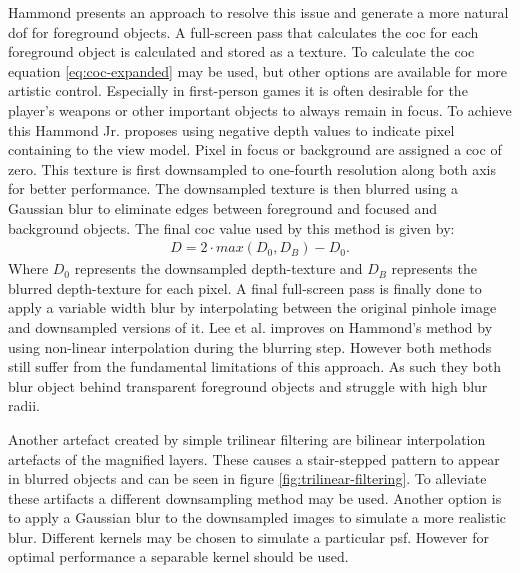Hammond \cite{Hammon.2008} presents an approach to resolve this issue and generate a more natural \gls{dof} for foreground objects.
A full-screen pass that calculates the \gls{coc} for each foreground object is calculated and stored as a texture.
To calculate the \gls{coc} equation \ref{eq:coc-expanded} may be used, but other options are available for more artistic control.
Especially in first-person games it is often desirable for the player's weapons or other important objects to always remain in focus.
To achieve this Hammond Jr. proposes using negative depth values to indicate pixel containing to the view model.
Pixel in focus or background are assigned a \gls{coc} of zero.
This texture is first downsampled to one-fourth resolution along both axis for better performance.
The downsampled texture is then blurred using a Gaussian blur to eliminate edges between foreground and focused and background objects.
The final \gls{coc} value used by this method is given by:
\begin{align}
    D = 2 \cdot max(D_0, D_B) - D_0.
\end{align}
Where $D_0$ represents the downsampled depth-texture and $D_B$ represents the blurred depth-texture for each pixel.
A final full-screen pass is finally done to apply a variable width blur by interpolating between the original pinhole image and downsampled versions of it.
Lee et al. \cite{Lee.2009} improves on Hammond's method by using non-linear interpolation during the blurring step.
However both methods still suffer from the fundamental limitations of this approach.
As such they both blur object behind transparent foreground objects and struggle with high blur radii.

Another artefact created by simple trilinear filtering are bilinear interpolation artefacts of the magnified layers.
These causes a stair-stepped pattern to appear in blurred objects and can be seen in figure \ref{fig:trilinear-filtering}.
To alleviate these artifacts a different downsampling method may be used.
Another option is to apply a Gaussian blur to the downsampled images to simulate a more realistic blur.
Different kernels may be chosen to simulate a particular \gls{psf}.
However for optimal performance a separable kernel should be used.\cite{Demers.2005, Gilham.2007}



